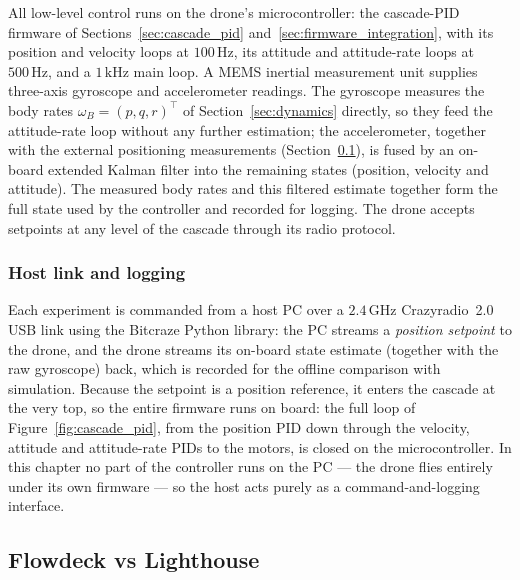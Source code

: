 \documentclass[11pt,a4paper]{article}
\theoremstyle{remark}
\numberwithin{equation}{section}
\begin{document}
All low-level control runs on the drone's microcontroller: the cascade-PID firmware
of Sections~\ref{sec:cascade_pid} and~\ref{sec:firmware_integration}, with its
position and velocity loops at $100\,\mathrm{Hz}$, its attitude and attitude-rate
loops at $500\,\mathrm{Hz}$, and a $1\,\mathrm{kHz}$ main loop. A MEMS inertial
measurement unit supplies three-axis gyroscope and accelerometer readings. The
gyroscope measures the body rates $\omega_B = (p,q,r)^\top$ of
Section~\ref{sec:dynamics} directly, so they feed the attitude-rate loop without any
further estimation; the accelerometer, together with the external positioning
measurements (Section~\ref{sec:flowdeck_lighthouse}), is fused by an on-board extended
Kalman filter into the remaining states (position, velocity and attitude). The measured
body rates and this filtered estimate together form the full state used by the controller
and recorded for logging. The drone accepts setpoints at any level of the cascade through
its radio protocol.

\subsubsection*{Host link and logging}

Each experiment is commanded from a host PC over a $2.4\,\mathrm{GHz}$
Crazyradio~2.0 USB link using the Bitcraze Python library: the PC streams a
\emph{position setpoint} to the drone, and the drone streams its on-board state
estimate (together with the raw gyroscope) back, which is recorded for the offline
comparison with simulation. Because the setpoint is a position reference, it enters
the cascade at the very top, so the entire firmware runs on board: the full loop of
Figure~\ref{fig:cascade_pid}, from the position PID down through the velocity,
attitude and attitude-rate PIDs to the motors, is closed on the microcontroller. In
this chapter no part of the controller runs on the PC --- the drone flies entirely
under its own firmware --- so the host acts purely as a command-and-logging
interface.

\subsection{Flowdeck vs Lighthouse}\label{sec:flowdeck_lighthouse}
\end{document}
